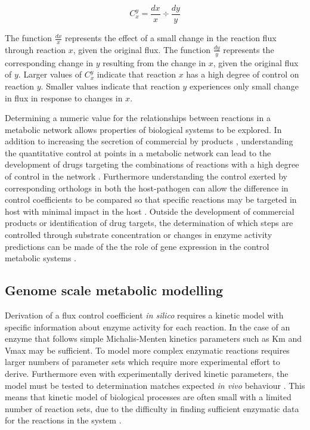 \begin{equation}\label{fcc}
C_{x}^{y} = \frac{dx}{x}\div\frac{dy}{y}
\end{equation}

The function $\frac{dx}{x}$ represents the effect of a small change in the reaction flux through reaction $x$, given the original flux. The function $\frac{dy}{y}$ represents the corresponding change in $y$ resulting from the change in $x$, given the original flux of $y$. Larger values of $C_{x}^{y}$ indicate that reaction $x$ has a high degree of control on reaction $y$. Smaller values indicate that reaction $y$ experiences only small change in flux in response to changes in $x$.

Determining a numeric value for the relationships between reactions in a metabolic network allows properties of biological systems to be explored. In addition to increasing the secretion of commercial by products \cite{niederberger1992}, understanding the quantitative control at points in a metabolic network can lead to the development of drugs targeting the combinations of reactions with a high degree of control in the network \cite{lehar2008,hopkins2008}. Furthermore understanding the control exerted by corresponding orthologs in both the host-pathogen can allow the difference in control coefficients to be compared so that specific reactions may be targeted in host with minimal impact in the host \cite{hornberg2007}. Outside the development of commercial products or identification of drug targets, the determination of which steps are controlled through substrate concentration or changes in enzyme activity predictions can be made of the the role of gene expression in the control metabolic systems \cite{rossell2006,daran-lapujade2007}.


\subsection{Genome scale metabolic modelling}

Derivation of a flux control coefficient \emph{in silico} requires a kinetic model with specific information about enzyme activity for each reaction. In the case of an enzyme that follows simple Michalis-Menten kinetics parameters such as Km and Vmax may be sufficient. To model more complex enzymatic reactions requires larger numbers of parameter sets which require more experimental effort to derive. Furthermore even with experimentally derived kinetic parameters, the model must be tested to determination matches expected \emph{in vivo} behaviour \cite{teusink2000}. This means that kinetic model of biological processes are often small with a limited number of reaction sets, due to the difficulty in finding sufficient enzymatic data for the reactions in the system \cite{steuer2007}.

